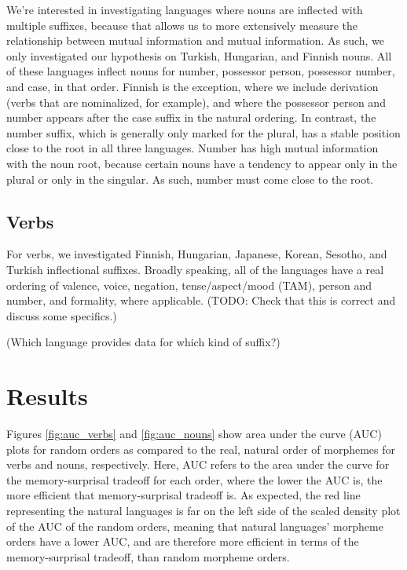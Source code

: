\documentclass[11pt,letterpaper]{article}
\newcommand\mhahn[1]{{\color{red}(#1)}}
\newcommand\becky[1]{{\color{blue}(#1)}}
\begin{document}
We're interested in investigating languages where nouns are inflected with multiple suffixes, because that allows us to more extensively measure the relationship between mutual information and mutual information. As such, we only investigated our hypothesis on Turkish, Hungarian, and Finnish nouns. All of these languages inflect nouns for number, possessor person, possessor number, and case, in that order. Finnish is the exception, where we include derivation (verbs that are nominalized, for example), and where the possessor person and number appears after the case suffix in the natural ordering. 
In contrast, the number suffix, which is generally only marked for the plural, has a stable position close to the root in all three languages. Number has high mutual information with the noun root, because certain nouns have a tendency to appear only in the plural or only in the singular. As such, number must come close to the root.


\subsection{Verbs}
For verbs, we investigated Finnish, Hungarian, Japanese, Korean, Sesotho, and Turkish inflectional suffixes. Broadly speaking, all of the languages have a real ordering of valence, voice, negation, tense/aspect/mood (TAM), person and number, and formality, where applicable. \becky{TODO: Check that this is correct and discuss some specifics.} 

\becky{Which language provides data for which kind of suffix?}




\section{Results}
Figures \ref{fig:auc_verbs} and \ref{fig:auc_nouns} show area under the curve (AUC) plots for random orders as compared to the real, natural order of morphemes for verbs and nouns, respectively. Here, AUC refers to the area under the curve for the memory-surprisal tradeoff for each order, where the lower the AUC is, the more efficient that memory-surprisal tradeoff is. As expected, the red line representing the natural languages is far on the left side of the scaled density plot of the AUC of the random orders, meaning that natural languages' morpheme orders have a lower AUC, and are therefore more efficient in terms of the memory-surprisal tradeoff, than random morpheme orders. 
\end{document}
